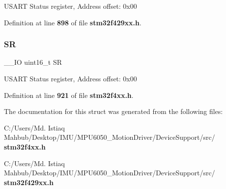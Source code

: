 U\+S\+A\+RT Status register, Address offset\+: 0x00 

Definition at line \textbf{ 898} of file \textbf{ stm32f429xx.\+h}.

\mbox{\label{structUSART__TypeDef_a44962ea5442d203bf4954035d1bfeb9d}} 
\subsubsection{SR\hspace{0.1cm}{\footnotesize\ttfamily [2/2]}}
{\footnotesize\ttfamily \+\_\+\+\_\+\+IO uint16\+\_\+t SR}

U\+S\+A\+RT Status register, Address offset\+: 0x00 

Definition at line \textbf{ 921} of file \textbf{ stm32f4xx.\+h}.



The documentation for this struct was generated from the following files\+:\begin{DoxyCompactItemize}
\item 
C\+:/\+Users/\+Md. Istiaq Mahbub/\+Desktop/\+I\+M\+U/\+M\+P\+U6050\+\_\+\+Motion\+Driver/\+Device\+Support/src/\textbf{ stm32f4xx.\+h}\item 
C\+:/\+Users/\+Md. Istiaq Mahbub/\+Desktop/\+I\+M\+U/\+M\+P\+U6050\+\_\+\+Motion\+Driver/\+Device\+Support/src/\textbf{ stm32f429xx.\+h}\end{DoxyCompactItemize}
